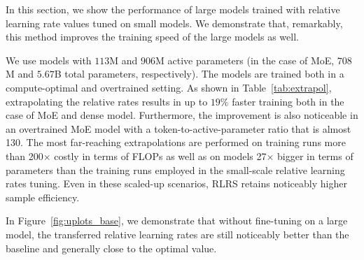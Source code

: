 \documentclass{article} %
\newcommand{\kas}[1]{\textcolor{magenta}{\sout{#1}}}
\newcommand{\jl}[1]{\textcolor{green}{[JL: #1]}}
\begin{document}

    In this section, we show the performance of large models trained with relative learning rate values tuned on small models. We demonstrate that, remarkably, this method improves the training speed of the large models as well.

    We use models with $113$M and $906$M active parameters (in the case of MoE, $708$M and $5.67$B total parameters, respectively). The models are trained both in a compute-optimal and overtrained setting.  
    As shown in Table~\ref{tab:extrapol}, extrapolating the relative rates results in up to $19\%$ faster training both in the case of MoE and dense model. Furthermore, the improvement is also noticeable in an overtrained MoE model with a token-to-active-parameter ratio that is almost 130. The most far-reaching extrapolations are performed on training runs more than 200$\times$ costly in terms of FLOPs as well as on models 27$\times$ bigger in terms of parameters than the training runs employed in the small-scale relative learning rates tuning. Even in these scaled-up scenarios, RLRS retains noticeably higher sample efficiency.

    In Figure~\ref{fig:uplots_base}, we demonstrate that without fine-tuning on a large model, the transferred relative learning rates are still noticeably better than the baseline and generally close to the optimal value. 


\end{document}
